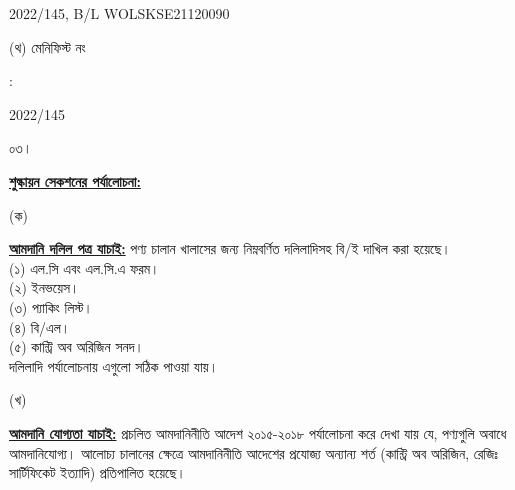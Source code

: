 \documentclass[12pt]{article}
\newcommand{\blno}{WOLSKSE21120090}
\newcommand{\menifest}{2022/145}
\begin{document}
\begin{minipage}[t]{0.53\linewidth}
{\menifest}, B/L {\blno}
\\
\end{minipage}
\begin{minipage}[t]{0.05\linewidth}
\hspace*{1em}
\end{minipage}
\begin{minipage}[t]{0.40\linewidth}
(থ) মেনিফিস্ট নং
\end{minipage}
\begin{minipage}[t]{0.02\linewidth}
:
\end{minipage}
\begin{minipage}[t]{0.53\linewidth}
{\menifest}
\\
\end{minipage}
\normalsize
\begin{minipage}[t]{0.05\linewidth}
০৩।
\end{minipage}
\begin{minipage}[t]{0.95\linewidth}
\underline{\textbf{শুল্কায়ন সেকশনের পর্যালোচনা:}}
\end{minipage}
\begin{minipage}[t]{0.05\linewidth}
\hspace{1em}
\end{minipage}
\begin{minipage}[t]{0.05\linewidth}
(ক)
\end{minipage}
\begin{minipage}[t]{0.90\linewidth}
\underline{\textbf{আমদানি দলিল পত্র যাচাই:}}
পণ্য চালান খালাসের জন্য নিম্নবর্ণিত দলিলাদিসহ বি/ই দাখিল করা
হয়েছে।
\\
(১) এল.সি এবং এল.সি.এ ফরম।
\\
(২) ইনভয়েস।
\\
(৩) প্যাকিং লিস্ট।
\\
(৪) বি/এল।
\\
(৫) কান্ট্রি অব অরিজিন সনদ।
\\
দলিলাদি পর্যালোচনায় এগুলো
সঠিক পাওয়া যায়।
\\
\end{minipage}
\begin{minipage}[t]{0.05\linewidth}
\hspace{1em}
\end{minipage}
\begin{minipage}[t]{0.05\linewidth}
(খ)
\end{minipage}
\begin{minipage}[t]{0.90\linewidth}
\underline{\textbf{আমদানি যোগ্যতা যাচাই:}}
প্রচলিত আমদানিনীতি আদেশ ২০১৫-২০১৮  পর্যালোচনা করে দেখা যায় যে, পণ্যগুলি অবাধে আমদানিযোগ্য।
আলোচ্য চালানের ক্ষেত্রে আমদানিনীতি আদেশের প্রযোজ্য অন্যান্য শর্ত (কান্ট্রি অব অরিজিন, রেজিঃ
সার্টিফিকেট ইত্যাদি) প্রতিপালিত হয়েছে।
\\
\end{minipage}
\end{document}
